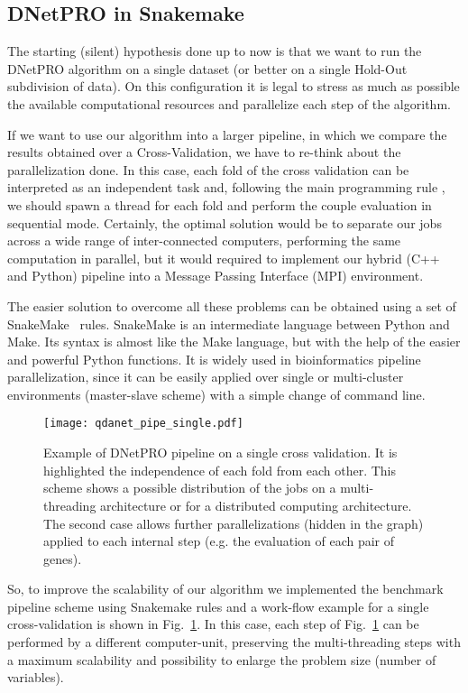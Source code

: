 \documentclass{standalone}
\begin{document}
\subsection[Pipeline]{DNetPRO in Snakemake}\label{implementation:snakemake}

The starting (silent) hypothesis done up to now is that we want to run the \textsf{DNetPRO} algorithm on a single dataset (or better on a single Hold-Out subdivision of data).
On this configuration it is legal to stress as much as possible the available computational resources and parallelize each step of the algorithm.

If we want to use our algorithm into a larger pipeline, in which we compare the results obtained over a Cross-Validation, we have to re-think about the parallelization done.
In this case, each fold of the cross validation can be interpreted as an independent task and, following the main programming rule \emph{}, we should spawn a thread for each fold and perform the couple evaluation in sequential mode.
Certainly, the optimal solution would be to separate our jobs across a wide range of inter-connected computers, performing the same computation in parallel, but it would required to implement our hybrid (\textsf{C++} and \textsf{Python}) pipeline into a Message Passing Interface (MPI) environment.

The easier solution to overcome all these problems can be obtained using a set of \textsf{SnakeMake}~\cite{snakemake} rules.
\textsf{SnakeMake} is an intermediate language between \textsf{Python} and \textsf{Make}.
Its syntax is almost like the \textsf{Make} language, but with the help of the easier and powerful \textsf{Python} functions.
It is widely used in bioinformatics pipeline parallelization, since it can be easily applied over single or multi-cluster environments (master-slave scheme) with a simple change of command line.

\begin{center}
\begin{figure}[htbp]
\hspace{-2cm}
\texttt{[image: qdanet\_pipe\_single.pdf]}
\caption{Example of \textsf{DNetPRO} pipeline on a single cross validation.
It is highlighted the independence of each fold from each other.
This scheme shows a possible distribution of the jobs on a multi-threading architecture or for a distributed computing architecture.
The second case allows further parallelizations (hidden in the graph) applied to each internal step (e.g. the evaluation of each pair of genes).
}
\label{fig:dnet_workflow}
\end{figure}
\end{center}

So, to improve the scalability of our algorithm we implemented the benchmark pipeline scheme using \textsf{Snakemake} rules and a work-flow example for a single cross-validation is shown in Fig.~\ref{fig:dnet_workflow}.
In this case, each step of Fig.~\ref{fig:dnet_workflow} can be performed by a different computer-unit, preserving the multi-threading steps with a maximum scalability and possibility to enlarge the problem size (number of variables).
\end{document}
